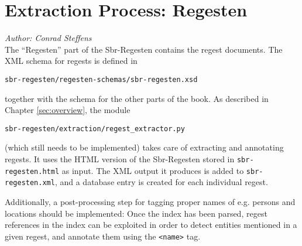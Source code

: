 \section{Extraction Process: Regesten}
\label{sec:regesten}

\emph{Author: Conrad Steffens} \\

The ``Regesten'' part of the Sbr-Regesten contains the regest
documents. The XML schema for regests is defined in

\begin{verbatim}
sbr-regesten/regesten-schemas/sbr-regesten.xsd
\end{verbatim}

together with the schema for the other parts of the book. As described
in Chapter \ref{sec:overview}, the module

\begin{verbatim}
sbr-regesten/extraction/regest_extractor.py
\end{verbatim}

(which still needs to be implemented) takes care of extracting
and annotating regests. It uses the HTML version of the Sbr-Regesten
stored in \texttt{sbr-regesten.html} as input. The XML output it
produces is added to \texttt{sbr-regesten.xml}, and a database entry
is created for each individual regest.

Additionally, a post-processing step for tagging proper names of e.g.
persons and locations should be implemented: Once the index has been
parsed, regest references in the index can be exploited in order to
detect entities mentioned in a given regest, and annotate them using
the \texttt{<name>} tag.
